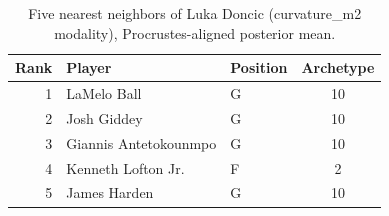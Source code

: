 \begin{table}[htbp]
  \centering\small
  \begin{tabular}{rllc}
    \toprule
    Rank & Player & Position & Archetype \\
    \midrule
    1 & LaMelo Ball & G & 10 \\
    2 & Josh Giddey & G & 10 \\
    3 & Giannis Antetokounmpo & G & 10 \\
    4 & Kenneth Lofton Jr. & F & 2 \\
    5 & James Harden & G & 10 \\
    \bottomrule
  \end{tabular}
  \caption{Five nearest neighbors of Luka Doncic (curvature_m2 modality), Procrustes-aligned posterior mean.}
  \label{tab:Luka_Doncic_neighbors_curvature_m2}
\end{table}

